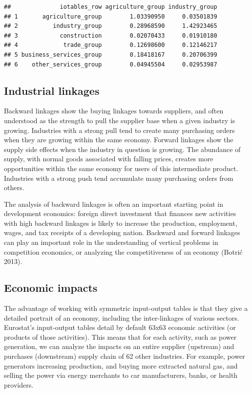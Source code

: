 \documentclass[
]{article}
\begin{document}
\begin{verbatim}
##              iotables_row agriculture_group industry_group
## 1       agriculture_group        1.03390950     0.03501839
## 2          industry_group        0.28968590     1.42923465
## 3            construction        0.02070433     0.01910180
## 4             trade_group        0.12698600     0.12146217
## 5 business_services_group        0.18418167     0.20706399
## 6    other_services_group        0.04945504     0.02953987
\end{verbatim}

\hypertarget{industrial-linkages}{%
\subsection{Industrial linkages}\label{industrial-linkages}}

Backward linkages show the buying linkages towards suppliers, and often
understood as the strength to pull the supplier base when a given
industry is growing. Industries with a strong pull tend to create many
purchasing orders when they are growing within the same economy. Forward
linkages show the supply side effects when the industry in question is
growing. The abundance of supply, with normal goods associated with
falling prices, creates more opportunities within the same economy for
users of this intermediate product. Industries with a strong push tend
accumulate many purchasing orders from others.

The analysis of backward linkages is often an important starting point
in development economics: foreign direct investment that finances new
activities with high backward linkages is likely to increase the
production, employment, wages, and tax receipts of a developing nation.
Backward and forward linkages can play an important role in the
understanding of vertical problems in competition economics, or
analyzing the competitiveness of an economy (Botrić 2013).

\hypertarget{economic-impacts}{%
\subsection{Economic impacts}\label{economic-impacts}}

The advantage of working with symmetric input-output tables is that they
give a detailed portrait of an economy, including the inter-linkages of
various sectors. Eurostat's input-output tables detail by default 63x63
economic activities (or products of those activities). This means that
for each activity, such as power generation, we can analyze the impacts
on an entire supplier (upstream) and purchases (downstream) supply chain
of 62 other industries. For example, power generators increasing
production, and buying more extracted natural gas, and selling the power
via energy merchants to car manufacturers, banks, or health providers.
\end{document}

